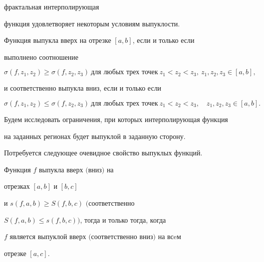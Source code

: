 фрактальная интерполирующая


функция удовлетворяет некоторым условиям выпуклости.


Функция выпукла вверх на отрезке $[a,b]$, если и только если


выполнено соотношение


$$




\sigma(f,z_1,z_2) \ge \sigma(f,z_2,z_3) \ \text{для любых трех точек}


\ z_1 < z_2 < z_3,\ z_1, z_2, z_3 \in [a,b],




$$


и соответственно выпукла вниз, если и только если


$$




\sigma(f,z_1,z_2) \le \sigma(f,z_2,z_3) \ \text{для любых трех точек}


\ z_1 < z_2 < z_3,\quad z_1, z_2, z_3 \in [a,b].




$$


Будем исследовать ограничения, при которых интерполирующая функция


на заданных регионах будет выпуклой в заданную сторону.





Потребуется следующее очевидное свойство выпуклых функций.





\begin{lem} \label{conv}


Функция $f$ выпукла вверх $($вниз$)$ на


отрезках $[a,b]$ и $[b,c]$


и $ s(f,a,b) \ge S(f,b,c) $ $($соответственно


$S(f,a,b) \le s(f,b,c))$, тогда и только тогда, когда


$ f $ является выпуклой вверх $($соответственно вниз$)$ на всeм


отрезке $[a,c]$.


\end{lem}





